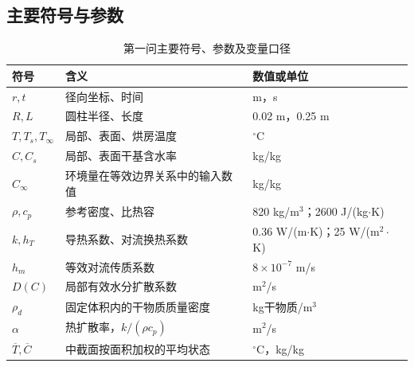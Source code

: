\subsection{主要符号与参数}
\begin{table}[htbp]
\centering\small
\caption{第一问主要符号、参数及变量口径}\label{tab:symbols}
\begin{tabularx}{\textwidth}{@{}lXl@{}}
\toprule
符号 & 含义 & 数值或单位\\
\midrule
$r,t$ & 径向坐标、时间 & m，s\\
$R,L$ & 圆柱半径、长度 & 0.02 m，0.25 m\\
$T,T_s,T_\infty$ & 局部、表面、烘房温度 & $^\circ$C\\
$C,C_s$ & 局部、表面干基含水率 & kg/kg\\
$C_\infty$ & 环境量在等效边界关系中的输入数值 & kg/kg\\
$\rho,c_p$ & 参考密度、比热容 & 820 kg/m$^3$；2600 J/(kg$\cdot$K)\\
$k,h_T$ & 导热系数、对流换热系数 & 0.36 W/(m$\cdot$K)；25 W/(m$^2\cdot$K)\\
$h_m$ & 等效对流传质系数 & $8\times10^{-7}$ m/s\\
$D(C)$ & 局部有效水分扩散系数 & m$^2$/s\\
$\rho_d$ & 固定体积内的干物质质量密度 & kg干物质/m$^3$\\
$\alpha$ & 热扩散率，$k/(\rho c_p)$ & m$^2$/s\\
$\overline T,\overline C$ & 中截面按面积加权的平均状态 & $^\circ$C，kg/kg\\
\bottomrule
\end{tabularx}
\end{table}
\FloatBarrier
